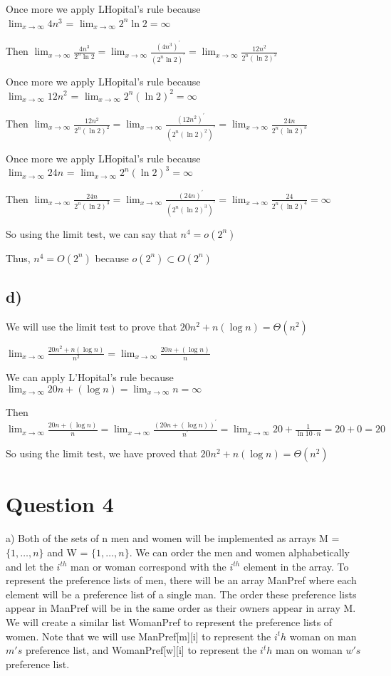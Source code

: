 \documentclass{article}
\begin{document}
Once more we apply LHopital's rule because \\
$\lim_{x \to \infty} 4n^3$ = $\lim_{x \to \infty} 2^n \ln 2 = \infty$

Then $\lim_{x \to \infty} \frac{4n^3}{2^n \ln 2} = \lim_{x \to \infty} \frac{(4n^3)^\prime}{(2^n \ln 2)^\prime} = \lim_{x \to \infty} \frac{12n^2}{2^n (\ln 2)^2}$

Once more we apply LHopital's rule because \\
$\lim_{x \to \infty} 12n^2$ = $\lim_{x \to \infty} 2^n (\ln 2)^2 = \infty$

Then $\lim_{x \to \infty} \frac{12n^2}{2^n (\ln 2)^2} = \lim_{x \to \infty} \frac{(12n^2)^\prime}{(2^n (\ln 2)^2)^\prime} = \lim_{x \to \infty} \frac{24n}{2^n (\ln 2)^3}$

Once more we apply LHopital's rule because \\
$\lim_{x \to \infty} 24n$ = $\lim_{x \to \infty} 2^n (\ln 2)^3 = \infty$

Then $\lim_{x \to \infty} \frac{24n}{2^n (\ln 2)^3} = \lim_{x \to \infty} \frac{(24n)^\prime}{(2^n (\ln 2)^3)^\prime} = \lim_{x \to \infty} \frac{24}{2^n (\ln 2)^4} = \infty$

So using the limit test, we can say that $n^4 = o(2^n)$

Thus, $n^4 = O(2^n)$ because $o(2^n) \subset O(2^n)$

\subsection*{d)}
We will use the limit test to prove that $20n^2+n (\log n) = \Theta(n^2)$

$\lim_{x \to \infty} \frac{20n^2+n(\log n)}{n^2} = \lim_{x \to \infty} \frac{20n+(\log n)}{n}$

We can apply L'Hopital's rule because
$\lim_{x \to \infty} 20n+(\log n) = \lim_{x \to \infty} n = \infty$

Then $\lim_{x \to \infty} \frac{20n+(\log n)}{n} = \lim_{x \to \infty} \frac{(20n+(\log n))^\prime}{n^\prime} = \lim_{x \to \infty} 20 + \frac{1}{\ln10 \cdot n} = 20+0 = 20$

So using the limit test, we have proved that $20n^2+n (\log n) = \Theta(n^2)$


\section*{Question 4}
a) Both of the sets of n men and women will be implemented as arrays M = $\{1, \dots, n\}$ and W = $\{1, \dots, n\}$. We can order the men and women alphabetically and let the $i^{th}$ man or woman correspond with the $i^{th}$ element in the array. To represent the preference lists of men, there will be an array ManPref where each element will be a preference list of a single man. The order these preference lists appear in ManPref will be in the same order as their owners appear in array M. We will create a similar list WomanPref to represent the preference lists of women. Note that we will use ManPref[m][i] to represent the $i^th$ woman on man $m's$ preference list, and WomanPref[w][i] to represent the $i^th$ man on woman $w's$ preference list.
\end{document}
